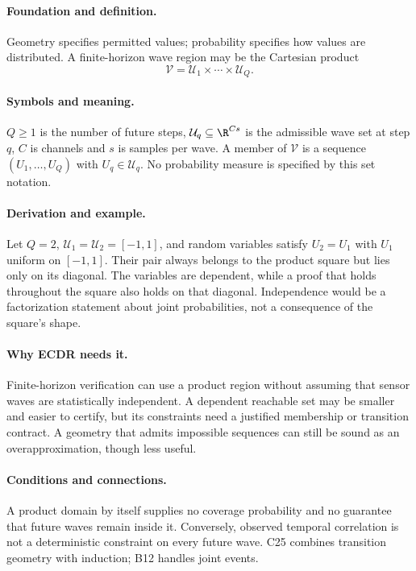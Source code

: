\paragraph{Foundation and definition.}
Geometry specifies permitted values; probability specifies how values are
distributed. A finite-horizon wave region may be the Cartesian product
\[
 \mathcal V=\mathcal U_1\times\cdots\times\mathcal U_Q.
\]
\paragraph{Symbols and meaning.}
$Q\ge1$ is the number of future steps, $\mathcal U_q\subseteq\R^{Cs}$
is the admissible wave set at step $q$, $C$ is channels and $s$ is
samples per wave. A member of $\mathcal V$ is a sequence
$(U_1,\ldots,U_Q)$ with $U_q\in\mathcal U_q$. No probability measure
is specified by this set notation.
\paragraph{Derivation and example.}
Let $Q=2$, $\mathcal U_1=\mathcal U_2=[-1,1]$, and random variables
satisfy $U_2=U_1$ with $U_1$ uniform on $[-1,1]$. Their pair always
belongs to the product square but lies only on its diagonal. The variables
are dependent, while a proof that holds throughout the square also holds
on that diagonal. Independence would be a factorization statement about
joint probabilities, not a consequence of the square's shape.
\paragraph{Why ECDR needs it.}
Finite-horizon verification can use a product region without assuming that
sensor waves are statistically independent. A dependent reachable set may
be smaller and easier to certify, but its constraints need a justified
membership or transition contract. A geometry that admits impossible
sequences can still be sound as an overapproximation, though less useful.
\paragraph{Conditions and connections.}
A product domain by itself supplies no coverage probability and no
guarantee that future waves remain inside it. Conversely, observed temporal
correlation is not a deterministic constraint on every future wave.
C25 combines transition geometry with induction; B12 handles joint events.

